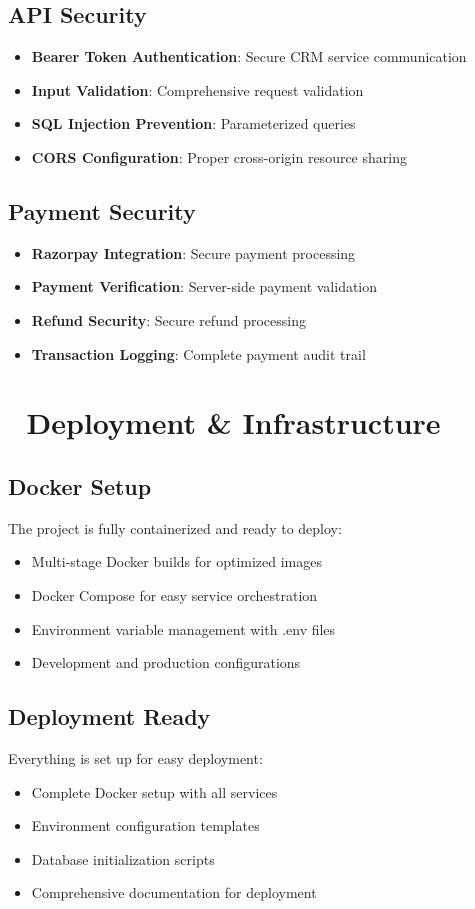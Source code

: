 \documentclass[12pt,a4paper]{article}
\begin{document}
\subsection{API Security}
\begin{itemize}
    \item \textbf{Bearer Token Authentication}: Secure CRM service communication
    \item \textbf{Input Validation}: Comprehensive request validation
    \item \textbf{SQL Injection Prevention}: Parameterized queries
    \item \textbf{CORS Configuration}: Proper cross-origin resource sharing
\end{itemize}

\subsection{Payment Security}
\begin{itemize}
    \item \textbf{Razorpay Integration}: Secure payment processing
    \item \textbf{Payment Verification}: Server-side payment validation
    \item \textbf{Refund Security}: Secure refund processing
    \item \textbf{Transaction Logging}: Complete payment audit trail
\end{itemize}

\section{🚀 Deployment \& Infrastructure}

\subsection{Docker Setup}
The project is fully containerized and ready to deploy:
\begin{itemize}
    \item Multi-stage Docker builds for optimized images
    \item Docker Compose for easy service orchestration
    \item Environment variable management with .env files
    \item Development and production configurations
\end{itemize}

\subsection{Deployment Ready}
Everything is set up for easy deployment:
\begin{itemize}
    \item Complete Docker setup with all services
    \item Environment configuration templates
    \item Database initialization scripts
    \item Comprehensive documentation for deployment
\end{itemize}
\end{document}
